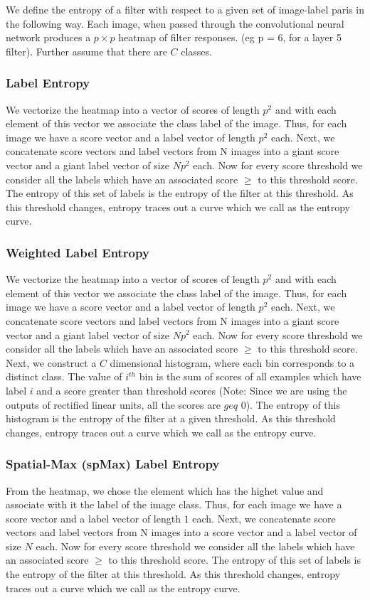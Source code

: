 \documentclass[runningheads]{llncs}
\begin{document}
We define the entropy of a filter with respect to a given set of image-label paris in the following way. Each image, when passed through the convolutional neural network produces a $p \times p$ heatmap of filter responses. (eg p = 6, for a layer 5 filter). Further assume that there are $C$ classes.
\subsubsection{Label Entropy}
\label{sub:def-label-ent}
We vectorize the heatmap into a vector of scores of length $p^2$ and with each element of this vector we associate the class label of the image. Thus, for each image we have a score vector and a label vector of length $p^2$ each. Next, we concatenate score vectors and label vectors from N images into a giant score vector and a giant label vector  of size $Np^2$ each. Now for every score threshold we consider all the labels which have an associated score $\geq$ to this threshold score. The entropy of this set of labels is the entropy of the filter at this threshold. As this threshold changes, entropy traces out a curve which we call as the entropy curve.  

\subsubsection{Weighted Label Entropy}
\label{sub:def-weighted-label-ent}
We vectorize the heatmap into a vector of scores of length $p^2$ and with each element of this vector we associate the class label of the image. Thus, for each image we have a score vector and a label vector of length $p^2$ each. Next, we concatenate score vectors and label vectors from N images into a giant score vector and a giant label vector  of size $Np^2$ each. Now for every score threshold we consider all the labels which have an associated score $\geq$ to this threshold score. Next, we construct a $C$ dimensional histogram, where each bin corresponds to a distinct class. The value of $i^{th}$ bin is the sum of scores of all examples which have label $i$ and a score greater than threshold scores (Note: Since we are using the outputs of rectified linear units, all the scores are $geq$ 0). The entropy of this histogram is the entropy of the filter at a given threshold. As this threshold changes, entropy traces out a curve which we call as the entropy curve.  

\subsubsection{Spatial-Max (spMax) Label Entropy}
\label{sub:def-spmax-label-ent}
From the heatmap, we chose the element which has the highet value and associate with it the label of the image class. Thus, for each image we have a score vector and a label vector of length $1$ each. Next, we concatenate score vectors and label vectors from N images into a  score vector and a  label vector  of size $N$ each. Now for every score threshold we consider all the labels which have an associated score $\geq$ to this threshold score. The entropy of this set of labels is the entropy of the filter at this threshold. As this threshold changes, entropy traces out a curve which we call as the entropy curve.
\end{document}
